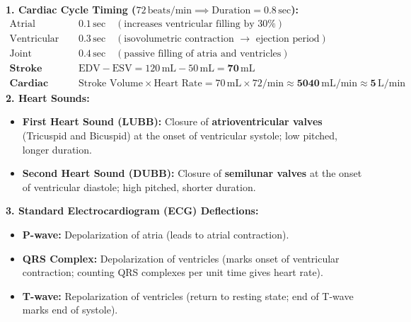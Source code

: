 \documentclass[10pt,a4paper]{article}
\begin{document}
\begin{formulabox}
\textbf{1. Cardiac Cycle Timing ($72\,\text{beats/min} \implies \text{Duration} = 0.8\,\mathrm{sec}$):}
\begin{align*}
  \text{Atrial Systole: } & 0.1\,\mathrm{sec} \quad (\text{increases ventricular filling by } 30\%)\\
  \text{Ventricular Systole: } & 0.3\,\mathrm{sec} \quad (\text{isovolumetric contraction } \to \text{ ejection period})\\
  \text{Joint Diastole: } & 0.4\,\mathrm{sec} \quad (\text{passive filling of atria and ventricles})\\
  \textbf{Stroke Volume (SV): } & \mathrm{EDV} - \mathrm{ESV} = 120\,\mathrm{mL} - 50\,\mathrm{mL} = \mathbf{70\,\mathrm{mL}}\\
  \textbf{Cardiac Output (CO): } & \text{Stroke Volume} \times \text{Heart Rate} = 70\,\mathrm{mL} \times 72/\mathrm{min} \approx \mathbf{5040\,\mathrm{mL/min} \approx 5\,\mathrm{L/min}}
\end{align*}
\textbf{2. Heart Sounds:}
\begin{itemize}
  \item \textbf{First Heart Sound (LUBB):} Closure of \textbf{atrioventricular valves} (Tricuspid and Bicuspid) at the onset of ventricular systole; low pitched, longer duration.
  \item \textbf{Second Heart Sound (DUBB):} Closure of \textbf{semilunar valves} at the onset of ventricular diastole; high pitched, shorter duration.
\end{itemize}
\textbf{3. Standard Electrocardiogram (ECG) Deflections:}
\begin{itemize}
  \item \textbf{P-wave:} Depolarization of atria (leads to atrial contraction).
  \item \textbf{QRS Complex:} Depolarization of ventricles (marks onset of ventricular contraction; counting QRS complexes per unit time gives heart rate).
  \item \textbf{T-wave:} Repolarization of ventricles (return to resting state; end of T-wave marks end of systole).
\end{itemize}
\end{formulabox}
\end{document}
